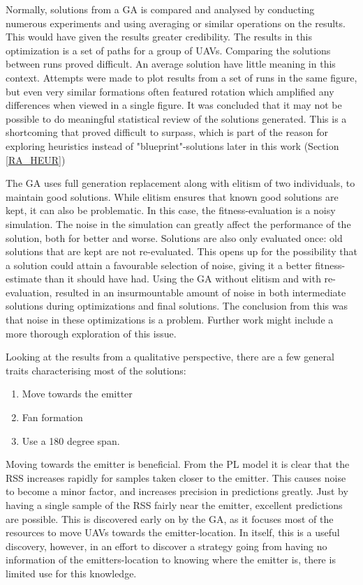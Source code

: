 \documentclass[10pt,a4paper]{book}
\begin{document}
Normally, solutions from a \gls{GA} is compared and analysed by conducting numerous experiments and using averaging or similar operations on the results. This would have given the results greater credibility. The results in this optimization is a set of paths for a group of \glspl{UAV}. Comparing the solutions between runs proved difficult. An average solution have little meaning in this context. Attempts were made to plot results from a set of runs in the same figure, but even very similar formations often featured rotation which amplified any differences when viewed in a single figure. It was concluded that it may not be possible to do meaningful statistical review of the solutions generated. This is a shortcoming that proved difficult to surpass, which is part of the reason for exploring heuristics instead of "blueprint"-solutions later in this work (Section \ref{RA_HEUR})

The \gls{GA} uses full generation replacement along with elitism of two individuals, to maintain good solutions. While elitism ensures that known good solutions are kept, it can also be problematic. In this case, the fitness-evaluation is a noisy simulation. The noise in the simulation can greatly affect the performance of the solution, both for better and worse. Solutions are also only evaluated once: old solutions that are kept are not re-evaluated. This opens up for the possibility that a solution could attain a favourable selection of noise, giving it a better fitness-estimate than it should have had. Using the \gls{GA} without elitism and with re-evaluation, resulted in an insurmountable amount of noise in both intermediate solutions during optimizations and final solutions. The conclusion from this was that noise in these optimizations is a problem. Further work might include a more thorough exploration of this issue.

Looking at the results from a qualitative perspective, there are a few general traits characterising most of the solutions:

\begin{enumerate}
\item Move towards the emitter
\item Fan formation
\item Use a 180 degree span.
\end{enumerate}

Moving towards the emitter is beneficial. From the \gls{PL} model it is clear that the \gls{RSS} increases rapidly for samples taken closer to the emitter. This causes noise to become a minor factor, and increases precision in predictions greatly. Just by having a single sample of the \gls{RSS} fairly near the emitter, excellent predictions are possible. This is discovered early on by the \gls{GA}, as it focuses most of the resources to move \glspl{UAV} towards the emitter-location. In itself, this is a useful discovery, however, in an effort to discover a strategy going from having no information of the emitters-location to knowing where the emitter is, there is limited use for this knowledge.
\end{document}
